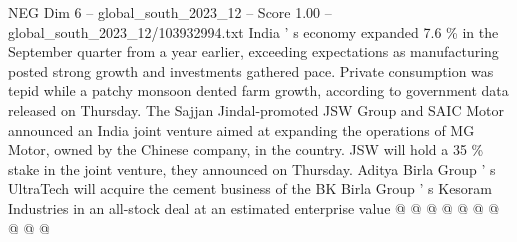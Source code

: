 \begin{textsample}{NEG Dim 6 – global\_south\_2023\_12 – Score 1.00 – global\_south\_2023\_12/103932994.txt}
India ' s economy expanded 7.6 \% in the September quarter from a year earlier, exceeding expectations as manufacturing posted strong growth and investments gathered pace.
Private consumption was tepid while a patchy monsoon dented farm growth, according to government data released on Thursday.
The Sajjan Jindal-promoted JSW Group and SAIC Motor announced an India joint venture aimed at expanding the operations of MG Motor, owned by the Chinese company, in the country.
JSW will hold a 35 \% stake in the joint venture, they announced on Thursday.
Aditya Birla Group ' s UltraTech will acquire the cement business of the BK Birla Group ' s Kesoram Industries in an all-stock deal at an estimated enterprise value @ @ @ @ @ @ @ @ @ @

\end{textsample}
